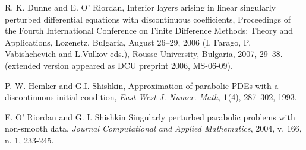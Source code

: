 \documentclass{layers17}
\begin{document}
\begin{thebibliography}{9}



 R. K. Dunne and E. O' Riordan, Interior layers arising in linear singularly  perturbed differential equations with discontinuous coefficients,  Proceedings of the Fourth International Conference on Finite Difference Methods: Theory and Applications, Lozenetz, Bulgaria, August 26--29, 2006 (I. Farago, P. Vabishchevich and L.Vulkov eds.), Rousse University, Bulgaria, 2007,  29--38. (extended version appeared as DCU preprint 2006, MS-06-09).


 P. W. Hemker and G.I. Shishkin,
Approximation of parabolic PDEs with a discontinuous initial condition,
{\em East-West J. Numer. Math}, {\bf 1}(4), 287--302, 1993.



 E. O' Riordan and G. I. Shishkin Singularly perturbed
parabolic problems with non-smooth data,  {\em Journal Computational and Applied Mathematics}, 2004, v. 166, n. 1, 233-245.


\end{thebibliography}


\end{document}

